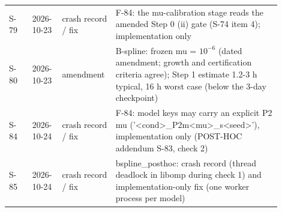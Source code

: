 {\begin{longtable}{R{0.08\linewidth} R{0.10\linewidth} R{0.14\linewidth} R{0.58\linewidth}}
S-79 & 2026-10-23 & crash record / fix & F-84: the mu-calibration stage reads the amended Step 0 (ii) gate (S-74 item 4); implementation only \\
S-80 & 2026-10-23 & amendment & B-spline: frozen mu = $10^{-6}$ (dated amendment; growth and certification criteria agree); Step 1 estimate 1.2-3 h typical, 16 h worst case (below the 3-day checkpoint) \\
S-84 & 2026-10-24 & crash record / fix & F-84: model keys may carry an explicit P2 mu ('<cond>\_P2m<mu>\_s<seed>'), implementation only (POST-HOC addendum S-83, check 2) \\
S-85 & 2026-10-24 & crash record / fix & bspline\_posthoc: crash record (thread deadlock in libomp during check 1) and implementation-only fix (one worker process per model) \\
\bottomrule
\end{longtable}}
